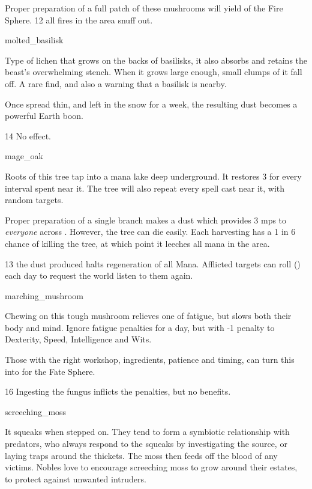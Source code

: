 \begin{multicols}{2}
{   Proper preparation of a full patch of these mushrooms will yield  of the Fire Sphere.
    }
  {}%
  {12}%
  {all fires in the \gls{area} snuff out.}%

%
  {molted_basilisk}%
  {
  Type of lichen that grows on the backs of basilisks, it also absorbs and retains the beast's overwhelming stench.
  When it grows large enough, small clumps of it fall off.
  A rare find, and also a warning that a basilisk is nearby.

  Once spread thin, and left in the snow for a week, the resulting dust becomes a powerful Earth \gls{boon}.
    }
{}%
{14}%
{No effect.}%

%
  {mage_oak}%
  {
    Roots of this tree tap into a mana lake deep underground.
    It restores 3  for every \gls{interval} spent near it.
    The tree will also repeat every spell cast near it, with random targets.

    Proper preparation of a single branch makes a dust which provides 3 \glspl{mp} to \emph{everyone} across .
    However, the tree can die easily.
    Each harvesting has a 1 in 6 chance of killing the tree, at which point it leeches all mana in the \gls{area}.
  }%
  {}%
  {13}%
  {the dust produced halts regeneration of all Mana.
  Afflicted targets can roll  (\tn[10]) each day to request the world listen to them again.}


%
  {marching_mushroom}%
  {
  Chewing on this tough mushroom relieves one of fatigue, but slows both their body and mind.
    Ignore \gls{fatigue} penalties for a day, but with -1 penalty to Dexterity, Speed, Intelligence and Wits.

    Those with the right workshop, ingredients, patience and timing, can turn this into  for the Fate Sphere.
    }
{}%
{16}%
{Ingesting the fungus inflicts the penalties, but no benefits.}%

%
  {screeching_moss}%
  {
  It squeaks when stepped on.
  They tend to form a symbiotic relationship with predators, who always respond to the squeaks by investigating the source, or laying traps around the thickets.
  The moss then feeds off the blood of any victims.
  Nobles love to encourage screeching moss to grow around their estates, to protect against unwanted intruders.

}
\end{multicols}
